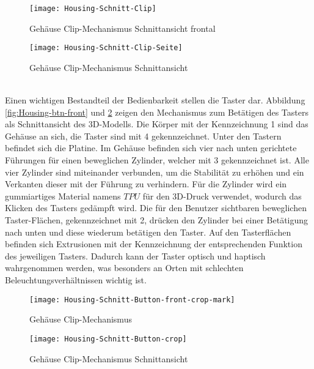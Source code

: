 \begin{figure}[h]
		\begin{minipage}{.45\linewidth}
		\centering
		\texttt{[image: Housing-Schnitt-Clip]}
		\caption{Gehäuse Clip-Mechanismus Schnittansicht frontal}
		\label{fig:Housing-clip}
	\end{minipage}
	\hfill
	\begin{minipage}{.45\linewidth}
		\centering
		\texttt{[image: Housing-Schnitt-Clip-Seite]}
		\caption{Gehäuse Clip-Mechanismus Schnittansicht}
		\label{fig:Housing-clip-side}
	\end{minipage}
\end{figure}\\
Einen wichtigen Bestandteil der Bedienbarkeit stellen die Taster dar. Abbildung \ref{fig:Housing-btn-front} und \ref{fig:Housing-btn} zeigen den Mechanismus zum Betätigen des Tasters als Schnittansicht des 3D-Modells. Die Körper mit der Kennzeichnung 1 sind das Gehäuse an sich, die Taster sind mit 4 gekennzeichnet. Unter den Tastern befindet sich die Platine. Im Gehäuse befinden sich vier nach unten gerichtete Führungen für einen beweglichen Zylinder, welcher mit 3 gekennzeichnet ist. Alle vier Zylinder sind miteinander verbunden, um die Stabilität zu erhöhen und ein Verkanten dieser mit der Führung zu verhindern. Für die Zylinder wird ein gummiartiges Material namens $TPU$ für den 3D-Druck verwendet, wodurch das Klicken des Tasters gedämpft wird. Die für den Benutzer sichtbaren beweglichen Taster-Flächen, gekennzeichnet mit 2, drücken den Zylinder bei einer Betätigung nach unten und diese wiederum betätigen den Taster. Auf den Tasterflächen befinden sich Extrusionen mit der Kennzeichnung der entsprechenden Funktion des jeweiligen Tasters. Dadurch kann der Taster optisch und haptisch wahrgenommen werden, was besonders an Orten mit schlechten Beleuchtungsverhältnissen wichtig ist.
\begin{figure}[h]
	\begin{minipage}{.45\linewidth}
		\centering
		\texttt{[image: Housing-Schnitt-Button-front-crop-mark]}
		\caption{Gehäuse Clip-Mechanismus}
		\label{fig:Housing-btn-front}
	\end{minipage}
	\hfill
	\begin{minipage}{.45\linewidth}
		\centering
		\texttt{[image: Housing-Schnitt-Button-crop]}
		\caption{Gehäuse Clip-Mechanismus Schnittansicht}
		\label{fig:Housing-btn}
	\end{minipage}
\end{figure}\\
